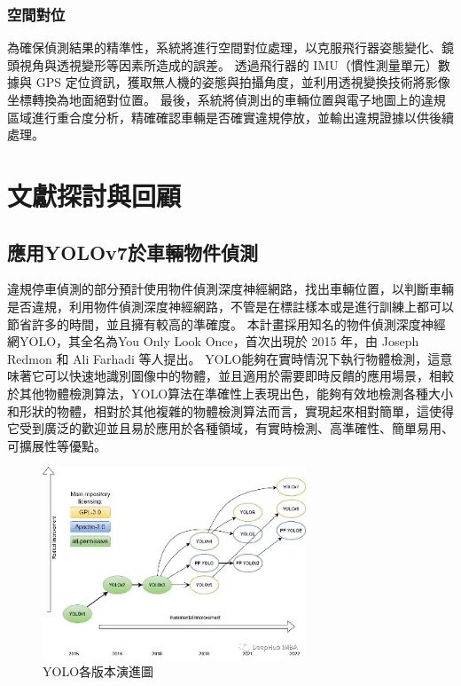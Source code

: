 \documentclass[12pt]{article}       %
\renewcommand{\figurename}{圖}                           %
\begin{document}
\subsubsection{空間對位}
\hspace{2em}為確保偵測結果的精準性，系統將進行空間對位處理，以克服飛行器姿態變化、鏡頭視角與透視變形等因素所造成的誤差。
透過飛行器的 IMU（慣性測量單元）數據與 GPS 定位資訊，獲取無人機的姿態與拍攝角度，並利用透視變換技術將影像坐標轉換為地面絕對位置。
最後，系統將偵測出的車輛位置與電子地圖上的違規區域進行重合度分析，精確確認車輛是否確實違規停放，並輸出違規證據以供後續處理。

\section{\centering 文獻探討與回顧}

\subsection{應用YOLOv7於車輛物件偵測}
\hspace{2em}違規停車偵測的部分預計使用物件偵測深度神經網路，找出車輛位置，以判斷車輛是否違規，利用物件偵測深度神經網路，不管是在標註樣本或是進行訓練上都可以節省許多的時間，並且擁有較高的準確度。
本計畫採用知名的物件偵測深度神經網YOLO，其全名為You Only Look Once，首次出現於 2015 年，由 Joseph Redmon 和 Ali Farhadi 等人提出\cite{ren_2015}。
YOLO能夠在實時情況下執行物體檢測，這意味著它可以快速地識別圖像中的物體，並且適用於需要即時反饋的應用場景，相較於其他物體檢測算法，YOLO算法在準確性上表現出色，能夠有效地檢測各種大小和形狀的物體，相對於其他複雜的物體檢測算法而言，實現起來相對簡單，這使得它受到廣泛的歡迎並且易於應用於各種領域，有實時檢測、高準確性、簡單易用、可擴展性等優點。

\begin{figure}[H]
    \centering
    \renewcommand{\figurename}{圖} %
    \includegraphics[width=0.7\textwidth]{yolov7_1.jpg}     %
    \caption{YOLO各版本演進圖\cite{tencent2023}}    %
    \label{fig:yolov7_1}    %
\end{figure}
\end{document}

